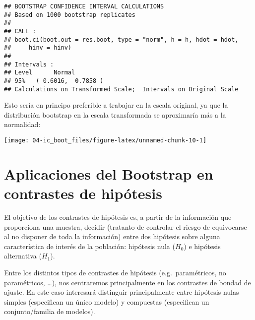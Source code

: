 \documentclass[]{book}
\newenvironment{Shaded}{\begin{snugshade}}{\end{snugshade}}
\newcommand{\KeywordTok}[1]{\textcolor[rgb]{0.13,0.29,0.53}{\textbf{#1}}}
\newcommand{\DataTypeTok}[1]{\textcolor[rgb]{0.13,0.29,0.53}{#1}}
\newcommand{\DecValTok}[1]{\textcolor[rgb]{0.00,0.00,0.81}{#1}}
\newcommand{\StringTok}[1]{\textcolor[rgb]{0.31,0.60,0.02}{#1}}
\newcommand{\OtherTok}[1]{\textcolor[rgb]{0.56,0.35,0.01}{#1}}
\newcommand{\OperatorTok}[1]{\textcolor[rgb]{0.81,0.36,0.00}{\textbf{#1}}}
\newcommand{\NormalTok}[1]{#1}
\theoremstyle{break}
\theoremstyle{definition}
\theoremstyle{definition}
\theoremstyle{definition}
\theoremstyle{remark}
\begin{document}
\begin{verbatim}
## BOOTSTRAP CONFIDENCE INTERVAL CALCULATIONS
## Based on 1000 bootstrap replicates
## 
## CALL : 
## boot.ci(boot.out = res.boot, type = "norm", h = h, hdot = hdot, 
##     hinv = hinv)
## 
## Intervals : 
## Level      Normal        
## 95%   ( 0.6016,  0.7858 )  
## Calculations on Transformed Scale;  Intervals on Original Scale
\end{verbatim}

Esto sería en principo preferible a trabajar en la escala original, ya
que la distribución bootstrap en la escala transformada se aproximaría
más a la normalidad:

\begin{Shaded}
\end{Shaded}

\begin{center}\texttt{[image: 04-ic\_boot\_files/figure-latex/unnamed-chunk-10-1]} \end{center}

\chapter{Aplicaciones del Bootstrap en contrastes de
hipótesis}\label{contrastes}

El objetivo de los contrastes de hipótesis es, a partir de la
información que proporciona una muestra, decidir (tratanto de controlar
el riesgo de equivocarse al no disponer de toda la información) entre
dos hipótesis sobre alguna característica de interés de la población:
hipótesis nula (\(H_{0}\)) e hipótesis alternativa (\(H_{1}\)).

Entre los distintos tipos de contrastes de hipótesis (e.g.~paramétricos,
no paramétricos, \ldots{}), nos centraremos principalmente en los
contrastes de bondad de ajuste. En este caso interesará distinguir
principalmente entre hipótesis nulas simples (especifican un único
modelo) y compuestas (especifican un conjunto/familia de modelos).
\end{document}
